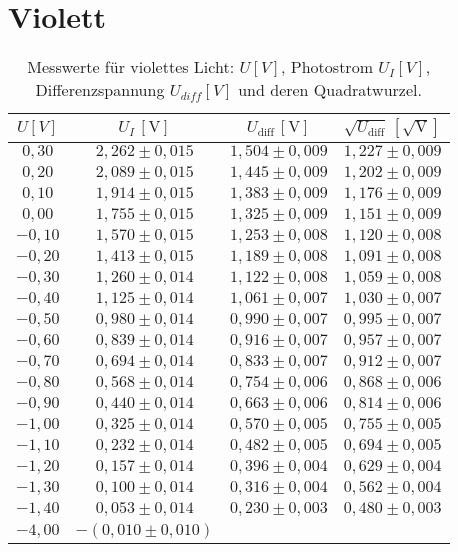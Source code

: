 \section{Violett}
\begin{table}[h!]
    \centering
    \begin{tabular}{cccc}
    \hline
    $U [V]$ & $U_I \, [\mathrm{V}]$ & $U_{\text{diff}} \, [\mathrm{V}]$ & $\sqrt{U_{\text{diff}}} \, [\mathrm{\sqrt{V}}]$ \\
    \hline
    $0,30$ & $2,262 \pm 0,015$ & $1,504 \pm 0,009$ & $1,227 \pm 0,009$ \\
    $0,20$ & $2,089 \pm 0,015$ & $1,445 \pm 0,009$ & $1,202 \pm 0,009$ \\
    $0,10$ & $1,914 \pm 0,015$ & $1,383 \pm 0,009$ & $1,176 \pm 0,009$ \\
    $0,00$ & $1,755 \pm 0,015$ & $1,325 \pm 0,009$ & $1,151 \pm 0,009$ \\
    $-0,10$ & $1,570 \pm 0,015$ & $1,253 \pm 0,008$ & $1,120 \pm 0,008$ \\
    $-0,20$ & $1,413 \pm 0,015$ & $1,189 \pm 0,008$ & $1,091 \pm 0,008$ \\
    $-0,30$ & $1,260 \pm 0,014$ & $1,122 \pm 0,008$ & $1,059 \pm 0,008$ \\
    $-0,40$ & $1,125 \pm 0,014$ & $1,061 \pm 0,007$ & $1,030 \pm 0,007$ \\
    $-0,50$ & $0,980 \pm 0,014$ & $0,990 \pm 0,007$ & $0,995 \pm 0,007$ \\
    $-0,60$ & $0,839 \pm 0,014$ & $0,916 \pm 0,007$ & $0,957 \pm 0,007$ \\
    $-0,70$ & $0,694 \pm 0,014$ & $0,833 \pm 0,007$ & $0,912 \pm 0,007$ \\
    $-0,80$ & $0,568 \pm 0,014$ & $0,754 \pm 0,006$ & $0,868 \pm 0,006$ \\
    $-0,90$ & $0,440 \pm 0,014$ & $0,663 \pm 0,006$ & $0,814 \pm 0,006$ \\
    $-1,00$ & $0,325 \pm 0,014$ & $0,570 \pm 0,005$ & $0,755 \pm 0,005$ \\
    $-1,10$ & $0,232 \pm 0,014$ & $0,482 \pm 0,005$ & $0,694 \pm 0,005$ \\
    $-1,20$ & $0,157 \pm 0,014$ & $0,396 \pm 0,004$ & $0,629 \pm 0,004$ \\
    $-1,30$ & $0,100 \pm 0,014$ & $0,316 \pm 0,004$ & $0,562 \pm 0,004$ \\
    $-1,40$ & $0,053 \pm 0,014$ & $0,230 \pm 0,003$ & $0,480 \pm 0,003$ \\
    $-4,00$ & $-(0,010 \pm 0,010)$ & & \\
    \hline
    \end{tabular}
    \caption{Messwerte für violettes Licht: $U [V]$, Photostrom $U_I [V]$, Differenzspannung $U_{diff} [V]$ und deren Quadratwurzel.}
    \label{tab:violett_values}
\end{table}


